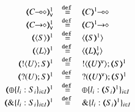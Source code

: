 \begin{figure}[h!]
\[\begin{array}{c}
\begin{array}{rcl}
			\\
			\tmap{\lhot{C}}{1}_\mathsf{v}	&\defeq& \lhot{\tmap{C}{1}}
			\\
			\tmap{\shot{C}}{1}_\mathsf{v}	&\defeq& \shot{\tmap{C}{1}}
			\\
			\tmap{\chtype{S}}{1}		&\defeq& \chtype{\tmap{S}{1}}
			\\
			\tmap{\chtype{L}}{1}		&\defeq& \chtype{\tmap{L}{1}_\mathsf{v}}
			\\
			\tmap{\btout{U} S}{1}		&\defeq& \btout{\tmap{U}{\mathsf{v}}} \tmap{S}{1}
			\\
			\tmap{\btinp{U} S}{1}		&\defeq& \btinp{\tmap{U}{\mathsf{v}}} \tmap{S}{1}
			\\
%
%
			\tmap{\btsel{l_i: S_i}_{i \in I}}{1} &\defeq& \btsel{l_i: \tmap{S_i}{1}}_{i \in I}
			\\
			\tmap{\btbra{l_i: S_i}_{i \in I}}{1} &\defeq& \btbra{l_i: \tmap{S_i}{1}}_{i \in I}
			\\


\end{array}
\end{array}\]
\end{figure}
